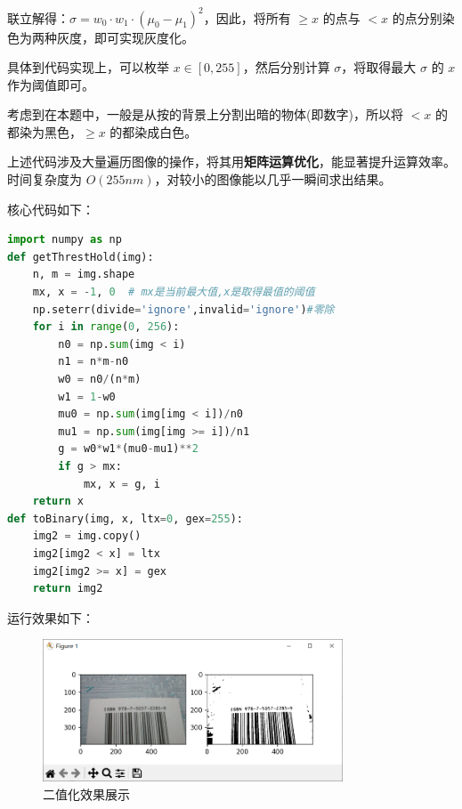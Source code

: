 \documentclass{ctexart}
\begin{document}
联立解得：$\sigma=w_0\cdot w_1\cdot (\mu_0-\mu_1)^2$，因此，将所有 $\ge x$ 的点与 $< x$ 的点分别染色为两种灰度，即可实现灰度化。

具体到代码实现上，可以枚举 $x\in[0,255]$，然后分别计算 $\sigma$，将取得最大 $\sigma$ 的 $x$ 作为阈值即可。

考虑到在本题中，一般是从按的背景上分割出暗的物体(即数字)，所以将 $< x$ 的都染为黑色，$\ge x$ 的都染成白色。

上述代码涉及大量遍历图像的操作，将其用\textbf{矩阵运算优化}，能显著提升运算效率。时间复杂度为 $O(255nm)$，对较小的图像能以几乎一瞬间求出结果。

核心代码如下：
\begin{lstlisting}[language=python]
import numpy as np
def getThrestHold(img):
    n, m = img.shape
    mx, x = -1, 0  # mx是当前最大值,x是取得最值的阈值
    np.seterr(divide='ignore',invalid='ignore')#零除
    for i in range(0, 256):
        n0 = np.sum(img < i)
        n1 = n*m-n0
        w0 = n0/(n*m)
        w1 = 1-w0
        mu0 = np.sum(img[img < i])/n0
        mu1 = np.sum(img[img >= i])/n1
        g = w0*w1*(mu0-mu1)**2
        if g > mx:
            mx, x = g, i
    return x
def toBinary(img, x, ltx=0, gex=255):
    img2 = img.copy()
    img2[img2 < x] = ltx
    img2[img2 >= x] = gex
    return img2
\end{lstlisting}
运行效果如下：
\begin{figure}[htbp]
    \centering
    \includegraphics[height=120pt]{sample_toBinary}
    \caption{二值化效果展示}
\end{figure}
\end{document}
